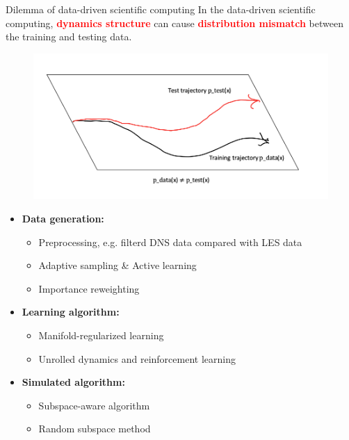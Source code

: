 \documentclass[aspectratio=169]{beamer}
\begin{document}
\begin{frame}{Dilemma of data-driven scientific computing}
	In the data-driven scientific computing, \textcolor{red}{\textbf{dynamics structure}} can cause \textcolor{red}{\textbf{distribution mismatch}} between the training and testing data.
	\begin{figure}[H]
          \centering
          \centerline{\includegraphics[width=\linewidth]{fig/dilemma.png}}
        \end{figure}
\end{frame}

\begin{frame}
	\begin{itemize}
		\item \textbf{Data generation:}
		\begin{itemize}
			\item Preprocessing, e.g. filterd DNS data compared with LES data
			\item Adaptive sampling \& Active learning
			\item Importance reweighting
		\end{itemize}
		\item \textbf{Learning algorithm:}
		\begin{itemize}
			\item Manifold-regularized learning
			\item Unrolled dynamics and reinforcement learning
		\end{itemize}
		\item \textbf{Simulated algorithm:}
		\begin{itemize}
			\item Subspace-aware algorithm
			\item Random subspace method
		\end{itemize}
	\end{itemize}
\end{frame}
\end{document}

